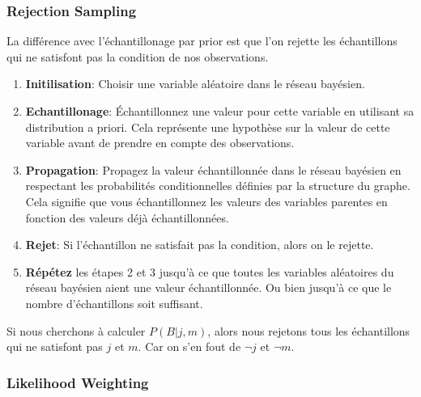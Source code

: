 
\subsubsection{Rejection Sampling} %
\label{sec:rejection_sampling} 

La différence avec l'échantillonage par prior est que l'on rejette les échantillons qui ne satisfont pas la condition de nos observations.

\begin{enumerate}
    \item \textbf{Initilisation}: Choisir une variable aléatoire dans le réseau bayésien.
    \item \textbf{Echantillonage}: Échantillonnez une valeur pour cette variable en utilisant sa distribution a priori. 
        Cela représente une hypothèse sur la valeur de cette variable avant de prendre en compte des observations.
    \item \textbf{Propagation}: Propagez la valeur échantillonnée dans le réseau bayésien en 
        respectant les probabilités conditionnelles définies par la structure du graphe. 
        Cela signifie que vous échantillonnez les valeurs des variables parentes en fonction des valeurs déjà échantillonnées.
    \item \textbf{Rejet}: Si l'échantillon ne satisfait pas la condition, alors on le rejette.
    \item \textbf{Répétez} les étapes 2 et 3 jusqu'à ce que toutes les variables aléatoires du réseau bayésien aient une valeur échantillonnée. Ou bien jusqu'à ce que le nombre d'échantillons soit suffisant.
\end{enumerate}

\begin{example}\leavevmode
    Si nous cherchons à calculer $P(B | j, m)$, alors nous rejetons tous les échantillons qui ne satisfont pas $j$ et $m$. Car 
    on s'en fout de $\neg j$ et $\neg m$.
\end{example}

\subsubsection{Likelihood Weighting} %
\label{sec:likelihood_weighting} 

